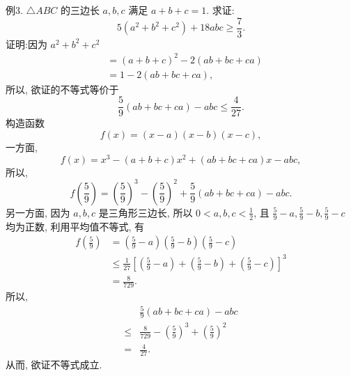 例3. $\triangle A B C$ 的三边长 $a, b, c$ 满足 $a+b+c=1$. 求证:
$$
5\left(a^2+b^2+c^2\right)+18 a b c \geqslant \frac{7}{3} .
$$
证明:因为 $a^2+b^2+c^2$
$$
\begin{aligned}
& =(a+b+c)^2-2(a b+b c+c a) \\
& =1-2(a b+b c+c a),
\end{aligned}
$$
所以, 欲证的不等式等价于
$$
\frac{5}{9}(a b+b c+c a)-a b c \leqslant \frac{4}{27} .
$$
构造函数
$$
f(x)=(x-a)(x-b)(x-c),
$$
一方面,
$$
f(x)=x^3-(a+b+c) x^2+(a b+b c+c a) x-a b c,
$$
所以,
$$
f\left(\frac{5}{9}\right)=\left(\frac{5}{9}\right)^3-\left(\frac{5}{9}\right)^2+\frac{5}{9}(a b+b c+c a)-a b c .
$$
另一方面, 因为 $a, b, c$ 是三角形三边长, 所以 $0<a, b, c<\frac{1}{2}$, 且 $\frac{5}{9}- a, \frac{5}{9}-b, \frac{5}{9}-c$ 均为正数, 利用平均值不等式, 有
$$
\begin{aligned}
f\left(\frac{5}{9}\right) & =\left(\frac{5}{9}-a\right)\left(\frac{5}{9}-b\right)\left(\frac{5}{9}-c\right) \\
& \leqslant \frac{1}{27}\left[\left(\frac{5}{9}-a\right)+\left(\frac{5}{9}-b\right)+\left(\frac{5}{9}-c\right)\right]^3 \\
& =\frac{8}{729} .
\end{aligned}
$$
所以,
$$
\begin{aligned}
& \frac{5}{9}(a b+b c+c a)-a b c \\
\leqslant & \frac{8}{729}-\left(\frac{5}{9}\right)^3+\left(\frac{5}{9}\right)^2 \\
= & \frac{4}{27} .
\end{aligned}
$$
从而, 欲证不等式成立.



